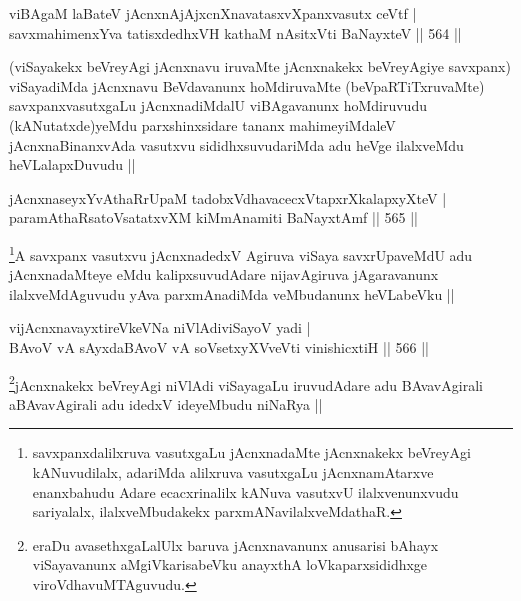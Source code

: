 
\begin{shl}
viBAgaM laBateV jAcnxnAjAjxcnXnavatasxvXpanxvasutx ceVtf | \\
savxmahimenxYva tatisxdedhxVH kathaM nAsitxVti BaNayxteV \hfill||  564 ||  
\end{shl}

\begin{artha}
(viSayakekx beVreyAgi jAcnxnavu iruvaMte jAcnxnakekx beVreyAgiye savxpanx) viSayadiMda jAcnxnavu BeVdavanunx hoMdiruvaMte (beVpaRTiTxruvaMte) savxpanxvasutxgaLu jAcnxnadiMdalU viBAgavanunx hoMdiruvudu (kANutatxde)yeMdu parxshinxsidare tananx mahimeyiMdaleV jAcnxnaBinanxvAda vasutxvu sididhxsuvudariMda adu heVge ilalxveMdu heVLalapxDuvudu ||
\end{artha}


\begin{shl}
jAcnxnaseyxYvAthaRrUpaM tadobxVdhavacecxVtapxrXkalapxyXteV | \\
paramAthaRsatoV\s satatxvXM kiMmAnamiti BaNayxtAmf \hfill||  565 ||  
\end{shl}

\begin{artha}
\footnote{savxpanxdalilxruva vasutxgaLu jAcnxnadaMte jAcnxnakekx beVreyAgi kANuvudilalx, adariMda alilxruva vasutxgaLu jAcnxnamAtarxve enanxbahudu Adare ecacxrinalilx kANuva vasutxvU ilalxvenunxvudu sariyalalx, ilalxveMbudakekx parxmANavilalxveMdathaR.}A savxpanx vasutxvu jAcnxnadedxV Agiruva viSaya savxrUpaveMdU adu jAcnxnadaMteye eMdu kalipxsuvudAdare nijavAgiruva jAgaravanunx ilalxveMdAguvudu yAva parxmAnadiMda veMbudanunx heVLabeVku ||
\end{artha}


\begin{shl}
vijAcnxnavayxtireVkeVNa niVlAdiviSayoV yadi | \\
BAvoV vA sAyxdaBAvoV vA soV\s setxyXVveVti vinishicxtiH \hfill||  566 ||  
\end{shl}

\begin{artha}
\footnote{eraDu avasethxgaLalUlx baruva jAcnxnavanunx anusarisi bAhayx viSayavanunx aMgiVkarisabeVku anayxthA loVkaparxsididhxge viroVdhavuMTAguvudu.}jAcnxnakekx beVreyAgi niVlAdi viSayagaLu iruvudAdare adu BAvavAgirali aBAvavAgirali adu idedxV ideyeMbudu niNaRya ||
\end{artha}

